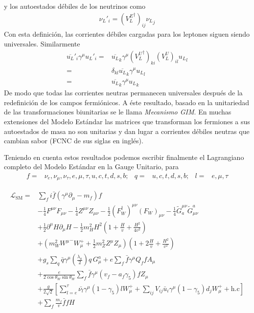 \begin{frame}
y los autoestados débiles de los neutrinos como
\begin{align}
  {\nu_L}'_i=({V^E_L}^\dagger)_{ij}{\nu_L}_j
\end{align}
Con esta definición, las corrientes débiles cargadas para los leptones siguen siendo universales. Similarmente
\begin{align}
   \overline{u_L}'_i \gamma^\mu{u_L}'_i=&\overline{u_L}_k\gamma^\mu({V^U_L}^\dagger)_{ki}(V^U_L)_{il} {u_L}_l\nonumber\\
  =&\delta_{kl}\overline{u_L}_k \gamma^\mu{u_L}_l\nonumber\\
  =&\overline{u_L}_k\gamma^\mu {u_L}_k
 \end{align}
De modo que todas las corrientes neutras permanecen universales después de la redefinición de los campos fermiónicos. A éste resultado, basado en la unitariedad de las transformaciones biunitarias se le llama \emph{Mecanismo GIM}. En muchas extensiones del Modelo Estándar las matrices que transforman los fermiones a sus autoestados de masa no son unitarias y dan lugar a corrientes débiles neutras que cambian sabor (FCNC de sus siglas en inglés). 

\newpage{}

Teniendo en cuenta estos resultados podemos escribir finalmente el Lagrangiano completo del Modelo Estándar en la Gauge Unitario, para
\begin{align}
  f=&\nu_e,\nu_\mu,\nu_\tau,e,\mu,\tau,u,c,t,d,s,b;&q=&u,c,t,d,s,b;&l=&e,\mu,\tau
\end{align}

\begin{align}
   \mathcal{L}_{\text{SM}}=&\sum_f i\bar{f}\left(\gamma^\mu\partial_\mu-m_f\right)f\nonumber\\
&-\tfrac{1}{4}F^{\mu\nu} F_{\mu\nu}-\tfrac{1}{4}Z^{\mu\nu} Z_{\mu\nu}-\tfrac{1}{2}(F_W^\dagger)^{\mu\nu} (F_W)_{\mu\nu}
- \tfrac{1}{4}\widetilde{G}^{\mu\nu}_a \widetilde{G}_{\mu\nu}^a\nonumber\\
&+\tfrac{1}{2}\partial^\mu H\partial_\mu H
-\frac{1}{2}m_H^2H^2\left(1+\frac{H}{v}+\frac{H^2}{4v^2}\right)\nonumber\\
&+\left(m_W^2{W^\mu}^-W_\mu^++\frac{1}{2}m_Z^2Z^\mu Z_\mu\right)\left(1+2\frac{H}{v}+\frac{H^2}{v^2}\right)\nonumber\\
&+g_s\sum_q\bar{q}\gamma^\mu\left(\frac{\lambda_a}{2}\right)q\,G_\mu^a+e\sum_f \bar{f}\gamma^\mu Q_f f A_\mu\nonumber\\
&+\frac{e}{2\cos\theta_W\sin\theta_W}\sum_{f}\bar{f}\gamma^\mu(v_f-a_f\gamma_5)f Z_\mu\nonumber\\
&+\frac{g}{2\sqrt{2}}\left[\sum_{l=e}^{\tau}\bar{\nu_l}\gamma^\mu(1-\gamma_5)l W_\mu^++\sum_{ij}V_{ij}\bar{u}_i\gamma^\mu(1-\gamma_5)d_j W_\mu^++\text{h.c}\right]\nonumber\\
&+\sum_f \frac{m_f}{v} \bar{f}f H\nonumber
\end{align}

\end{frame}
